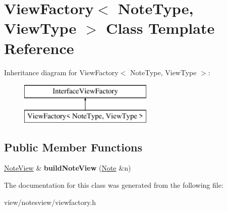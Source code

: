 \hypertarget{class_view_factory}{\section{View\-Factory$<$ Note\-Type, View\-Type $>$ Class Template Reference}
\label{class_view_factory}
}
Inheritance diagram for View\-Factory$<$ Note\-Type, View\-Type $>$\-:\begin{figure}[H]
\begin{center}
\leavevmode
\includegraphics[height=2.000000cm]{class_view_factory}
\end{center}
\end{figure}
\subsection*{Public Member Functions}
\begin{DoxyCompactItemize}
\item 
\hypertarget{class_view_factory_af07308df17f847547060644fad9ff914}{\hyperlink{class_note_view}{Note\-View} \& {\bfseries build\-Note\-View} (\hyperlink{class_note}{Note} \&n)}\label{class_view_factory_af07308df17f847547060644fad9ff914}

\end{DoxyCompactItemize}


The documentation for this class was generated from the following file\-:\begin{DoxyCompactItemize}
\item 
view/notesview/viewfactory.\-h\end{DoxyCompactItemize}
